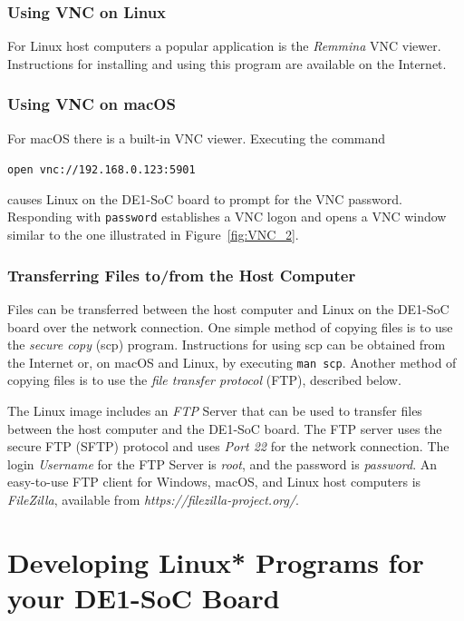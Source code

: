 \documentclass[11pt, twoside, pdftex]{article}
\begin{document}
\subsubsection{Using VNC on Linux}

For Linux host computers a popular application is the {\it Remmina} VNC viewer.
Instructions for installing and using this program are available on the Internet.

\subsubsection{Using VNC on macOS}

For macOS there is a built-in VNC viewer. Executing the command

\texttt{open vnc://192.168.0.123:5901}

causes Linux on the DE1-SoC board to prompt for the VNC password. Responding with
\texttt{password} establishes a VNC logon and opens a VNC window similar to the one 
illustrated in Figure~\ref{fig:VNC_2}.

\subsubsection{Transferring Files to/from the Host Computer}
\label{sec:ftp}

Files can be transferred between the host computer and Linux on the DE1-SoC board over the
network connection. One simple method of copying files is to use the {\it secure copy} (scp)
program. Instructions for using scp can be obtained from the Internet or, on macOS and
Linux, by executing \texttt{man scp}. Another method of copying files is to use the 
{\it file transfer protocol} (FTP), described below.  

The Linux image includes an {\it FTP} Server that can be used to transfer files
between the host computer and the DE1-SoC board. The FTP server uses the secure FTP
(SFTP) protocol and uses {\it Port 22} for the network connection. The login 
{\it Username} for the FTP Server is {\it root}, and the password is {\it password}. An
easy-to-use FTP client for Windows, macOS, and Linux host computers is {\it FileZilla}, 
available from {\it https://filezilla-project.org/}.

\section{Developing Linux* Programs for your DE1-SoC Board}
\label{sec:linux_programs}
\end{document}
